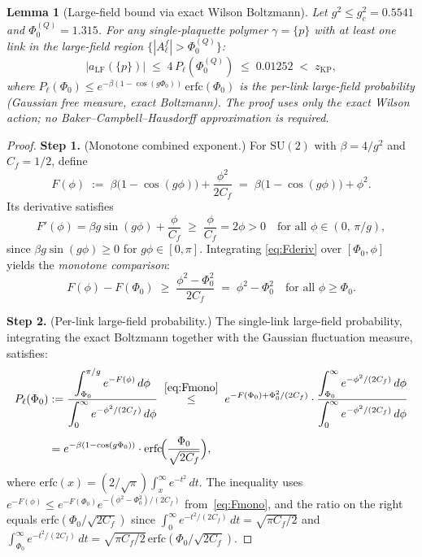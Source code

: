 \documentclass[11pt,a4paper]{amsart}
\newtheorem{lemma}[theorem]{Lemma}
\theoremstyle{definition}
\newcommand{\SU}{\mathrm{SU}}
\newcommand{\Cf}{C_f}
\newcommand{\zKP}{z_{\mathrm{KP}}}
\begin{document}
\begin{lemma}[Large-field bound via exact Wilson Boltzmann]
\label{lem:LF_quartic}
Let $g^2 \le g^2_c = 0.5541$ and $\Phi_0^{(Q)} = 1.315$.
For any single-plaquette polymer $\gamma = \{p\}$ with at least one link in the
large-field region $\{|A^f_\ell|>\Phi_0^{(Q)}\}$:
\begin{equation}
\label{eq:LF_quartic_claim}
  |a_{\mathrm{LF}}(\{p\})| \;\le\; 4\,P_\ell(\Phi_0^{(Q)}) \;\le\; 0.01252 \;<\; \zKP,
\end{equation}
where $P_\ell(\Phi_0) \le e^{-\beta(1-\cos(g\Phi_0))}\,\mathrm{erfc}(\Phi_0)$
is the per-link large-field probability (Gaussian free measure, exact Boltzmann).
The proof uses only the exact Wilson action; no Baker--Campbell--Hausdorff approximation
is required.
\end{lemma}
\begin{proof}
\textbf{Step 1.} (Monotone combined exponent.)
For $\SU(2)$ with $\beta = 4/g^2$ and $\Cf = 1/2$, define
\[
  F(\phi) \;:=\; \beta\bigl(1-\cos(g\phi)\bigr) + \frac{\phi^2}{2\Cf}
  \;=\; \beta\bigl(1-\cos(g\phi)\bigr) + \phi^2.
\]
Its derivative satisfies
\begin{equation}\label{eq:Fderiv}
  F'(\phi) = \beta g\sin(g\phi) + \frac{\phi}{\Cf}
  \;\ge\; \frac{\phi}{\Cf} = 2\phi > 0
  \quad \text{for all } \phi \in (0,\,\pi/g),
\end{equation}
since $\beta g\sin(g\phi)\ge 0$ for $g\phi\in[0,\pi]$.
Integrating \eqref{eq:Fderiv} over $[\Phi_0,\phi]$ yields the
\emph{monotone comparison}:
\begin{equation}\label{eq:Fmono}
  F(\phi) - F(\Phi_0) \;\ge\; \frac{\phi^2 - \Phi_0^2}{2\Cf}
  \;=\; \phi^2 - \Phi_0^2
  \quad \text{for all } \phi \ge \Phi_0.
\end{equation}

\textbf{Step 2.} (Per-link large-field probability.)
The single-link large-field probability, integrating the exact Boltzmann
together with the Gaussian fluctuation measure, satisfies:
\begin{align}
  P_\ell(\Phi_0)
  &:= \frac{\displaystyle\int_{\Phi_0}^{\pi/g} e^{-F(\phi)}\,d\phi}
       {\displaystyle\int_0^{\infty} e^{-\phi^2/(2\Cf)}\,d\phi}
  \;\stackrel{\eqref{eq:Fmono}}{\le}\;
  e^{-F(\Phi_0)+\Phi_0^2/(2\Cf)}
  \cdot
  \frac{\displaystyle\int_{\Phi_0}^{\infty} e^{-\phi^2/(2\Cf)}\,d\phi}
       {\displaystyle\int_0^{\infty} e^{-\phi^2/(2\Cf)}\,d\phi}
  \nonumber\\[4pt]
  &= e^{-\beta(1-\cos(g\Phi_0))}
     \cdot \mathrm{erfc}\!\Bigl(\frac{\Phi_0}{\sqrt{2\Cf}}\Bigr),
     \label{eq:Perfc}
\end{align}
where $\mathrm{erfc}(x) = (2/\sqrt{\pi})\int_x^\infty e^{-t^2}\,dt$.
The inequality uses $e^{-F(\phi)} \le e^{-F(\Phi_0)}e^{-(\phi^2-\Phi_0^2)/(2\Cf)}$
from~\eqref{eq:Fmono}, and the ratio on the right equals $\mathrm{erfc}(\Phi_0/\sqrt{2\Cf})$
since $\int_0^\infty e^{-t^2/(2\Cf)}\,dt = \sqrt{\pi \Cf/2}$ and
$\int_{\Phi_0}^\infty e^{-t^2/(2\Cf)}\,dt = \sqrt{\pi\Cf/2}\,\mathrm{erfc}(\Phi_0/\sqrt{2\Cf})$.


\end{proof}
\end{document}
